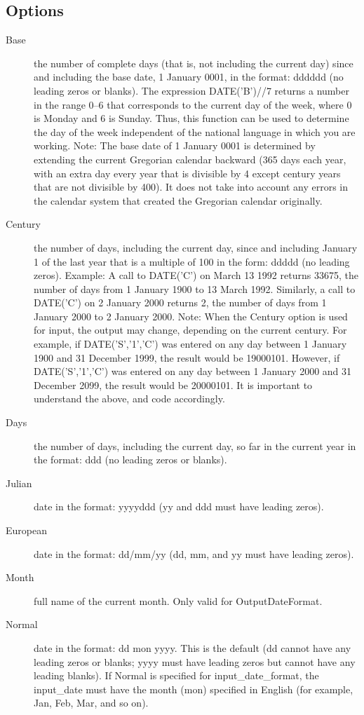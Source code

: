 \subsection{Options}
\begin{description}
\item[Base]
the number of complete days (that is, not including the current day) since and including the base date, 1 January 0001, in the format: dddddd (no leading zeros or blanks). The expression DATE('B')//7 returns a number in the range 0–6 that corresponds to the current day of the week, where 0 is Monday and 6 is Sunday.
Thus, this function can be used to determine the day of the week independent of the national language in which you are working.
Note: The base date of 1 January 0001 is determined by extending the current Gregorian calendar backward (365 days each year, with an extra day every year that is divisible by 4 except century years that are not divisible by 400). It does not take into account any errors in the calendar system that created the Gregorian calendar originally.
\item[Century]
the number of days, including the current day, since and including January 1 of the last year that is a multiple of 100 in the form: ddddd (no leading zeros). Example: A call to DATE('C') on March 13 1992 returns 33675, the number of days from 1 January 1900 to 13 March 1992. Similarly, a call to DATE('C') on 2 January 2000 returns 2, the number of days from 1 January 2000 to 2 January 2000.
Note: When the Century option is used for input, the output may change, depending on the current century. For example, if DATE('S','1','C') was entered on any day between 1 January 1900 and 31 December 1999, the result would be 19000101. However, if DATE('S','1','C') was entered on any day between 1 January 2000 and 31 December 2099, the result would be 20000101. It is important to understand the above, and code accordingly.
\item[Days]
the number of days, including the current day, so far in the current year in the format: ddd (no leading zeros or blanks).
\item[Julian]
  date in the format: yyyyddd (yy and ddd must have leading zeros).
 \item[European]
    date in the format: dd/mm/yy (dd, mm, and yy must have leading zeros).
\item[Month]
full name of the current month. Only valid for OutputDateFormat.
\item[Normal]
date in the format: dd mon yyyy. This is the default (dd cannot have any leading zeros or blanks; yyyy must have leading zeros but cannot have any leading blanks). If Normal is specified for input\_date\_format, the input\_date must have the month (mon) specified in English (for example, Jan, Feb, Mar, and so on).

\end{description}
